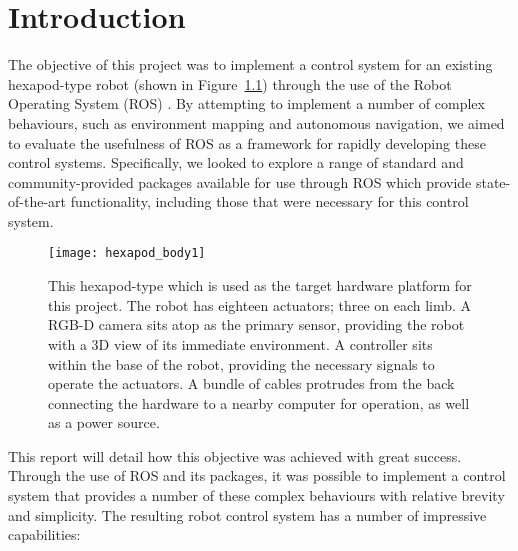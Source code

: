\chapter{Introduction}
\label{chap:introduction}


The objective of this project was to implement a control system for an existing hexapod-type robot (shown in Figure~\ref{fig:hexapod}) through the use of the Robot Operating System (ROS) \cite{ros_site}. By attempting to implement a number of complex behaviours, such as environment mapping and autonomous navigation, we aimed to evaluate the usefulness of ROS as a framework for rapidly developing these control systems. Specifically, we looked to explore a range of standard and community-provided packages available for use through ROS which provide state-of-the-art functionality, including those that were necessary for this control system.

\begin{figure}[t]
    \centering
    \texttt{[image: hexapod\_body1]}
    \caption{This hexapod-type which is used as the target hardware platform for this project. The robot has eighteen actuators; three on each limb. A RGB-D camera sits atop as the primary sensor, providing the robot with a 3D view of its immediate environment. A controller sits within the base of the robot, providing the necessary signals to operate the actuators. A bundle of cables protrudes from the back connecting the hardware to a nearby computer for operation, as well as a power source.}
    \label{fig:hexapod}
\end{figure}

This report will detail how this objective was achieved with great success. Through the use of ROS and its packages, it was possible to implement a control system that provides a number of these complex behaviours with relative brevity and simplicity. The resulting robot control system has a number of impressive capabilities:

